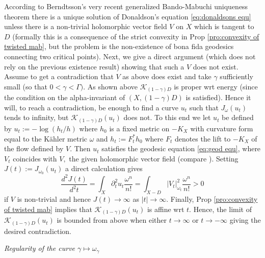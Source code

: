 \documentclass[11pt,oneside,english]{amsart}
\numberwithin{equation}{section}
\numberwithin{figure}{section}
\theoremstyle{plain}
\theoremstyle{plain}
\theoremstyle{plain}
\theoremstyle{plain}
\theoremstyle{remark}
\theoremstyle{definition}
\begin{document}
According to Berndtsson's very recent generalized Bando-Mabuchi uniqueness
theorem \cite{bern} there is a unique solution of Donaldson's equation
\ref{eq:donaldsons equ} unless there is a non-trivial holomorphic
vector field $V$ on $X$ which is tangent to $D$ (formally this
is a consequence of the strict convexity in Prop \ref{pro:convexity of twisted mab},
but the problem is the non-existence of bona fida geodesics connecting
two critical points). Next, we give a direct argument (which does
not rely on the previous existence result) showing that such a $V$
does not exist. Assume to get a contradiction that $V$ as above does
exist and take $\gamma$ sufficiently small (so that $0<\gamma<\Gamma).$
As shown above $\mathcal{K}_{(1-\gamma)D}$ is proper wrt energy (since
the condition on the alpha-invariant of $(X,(1-\gamma)D)$ is satisfied).
Hence it will, to reach a contradiction, be enough to find a curve
$u_{t}$ such that $J_{\omega}(u_{t})$ tends to infinity, but $\mathcal{K}_{(1-\gamma)D}(u_{t})$
does not. To this end we let $u_{t}$ be defined by $u_{t}:=-\log(h_{t}/h)$
where $h_{0}$ is a fixed metric on $-K_{X}$ with curvature form
equal to the Kähler metric $\omega$ and $h_{t}:=F_{t}^{*}h_{0}$
where $F_{t}$ denotes the lift to $-K_{X}$ of the flow defined by
$V.$ Then $u_{t}$ satisfies the geodesic equation \ref{eq:geod equ},
where $V_{t}$ coincides with $V,$ the given holomorphic vector field
(compare \cite{d00}). Setting $J(t):=J_{\omega_{0}}(u_{t})$ a direct
calculation gives 
\[
\frac{d^{2}J(t)}{d^{2}t}=\int_{X}\partial_{t}^{2}u_{t}\frac{\omega^{n}}{n!}=\int_{X-D}|V_{t}|_{\omega_{t}}^{2}\frac{\omega^{n}}{n!}>0
\]
 if $V$ is non-trivial and hence $J(t)\rightarrow\infty$ as $|t|\rightarrow\infty.$
Finally, Prop \ref{pro:convexity of twisted mab} implies that $\mathcal{K}_{(1-\gamma)D}(u_{t})$
is affine wrt $t.$ Hence, the limit of $\mathcal{K}_{(1-\gamma)D}(u_{t})$
is bounded from above when either $t\rightarrow\infty$ or $t\rightarrow-\infty$
giving the desired contradiction.

\emph{Regularity of the curve $\gamma\mapsto\omega_{\gamma}$}
\end{document}
